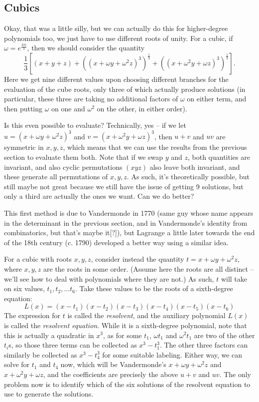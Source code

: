 \documentclass[12pt]{scrartcl}
\begin{document}
\subsection{Cubics}
Okay, that was a little silly, but we can actually do this for higher-degree polynomials too, we just have to use different roots of unity. For a cubic, if $\omega = e^{\frac{2\pi i}3}$, then we should consider the quantity
\[ \frac 13 [(x + y + z) + ((x + \omega y + \omega^2 z)^3)^{\frac 13} + ((x + \omega^2 y  + \omega z)^3)^{\frac 13}].\]
Here we get nine different values upon choosing different branches for the evaluation of the cube roots, only three of which actually produce solutions (in particular, these three are taking no additional factors of $\omega$ on either term, and then putting $\omega$ on one and $\omega^2$ on the other, in either order).

Is this even possible to evaluate? Technically, yes -- if we let $u = (x + \omega y + \omega^2 z)^3$ and $v = (x + \omega^2 y + \omega z)^3$, then $u+v$ and $uv$ are symmetric in $x, y, z$, which means that we can use the results from the previous section to evaluate them both. Note that if we swap $y$ and $z$, both quantities are invariant, and also cyclic permutations $(x y z)$ also leave both invariant, and these generate all permutations of $x, y, z$. As such, it's theoretically possible, but still maybe not great because we still have the issue of getting 9 solutions, but only a third are actually the ones we want. Can we do better?

This first method is due to Vandermonde in 1770 (same guy whose name appears in the determinant in the previous section, and in Vandermonde's identity from combinatorics, but that's maybe it[?]), but Lagrange a little later towards the end of the 18th century (c. 1790) developed a better way using a similar idea.

For a cubic with roots $x, y, z$, consider instead the quantity $t = x + \omega y + \omega^2 z$, where $x, y, z$ are the roots in some order. (Assume here the roots are all distinct -- we'll see how to deal with polynomials where they are not.) As such, $t$ will take on six values, $t_1, t_2, \dots t_6$. Take these values to be the roots of a sixth-degree equation: 
\[
    L(x) = (x - t_1) (x - t_2) (x - t_3) (x - t_4) (x - t_5) (x - t_6)
\]
The expression for $t$ is called the \textit{resolvent}, and the auxiliary polynomial $L(x)$ is called the \textit{resolvent equation}. While it is a sixth-degree polynomial, note that this is actually a quadratic in $x^3$, as for some $t_1$, $\omega t_1$ and $\omega^2 t_1$ are two of the other $t_i$s, so those three terms can be collected as $x^3 - t_1^3$. The other three factors can similarly be collected as $x^3 - t_4^3$ for some suitable labeling. Either way, we can solve for $t_1$ and $t_4$ now, which will be Vandermonde's $x + \omega y + \omega^2 z$ and $x + \omega^2 y + \omega z$, and the coefficients are precisely the above $u + v$ and $uv$. The only problem now is to identify which of the six solutions of the resolvent equation to use to generate the solutions. 
\end{document}
